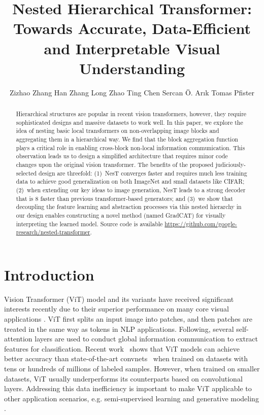 \documentclass{article}
\newcommand{\OURS}{NesT\xspace}
\begin{document}
\title{Nested Hierarchical Transformer: Towards Accurate, Data-Efficient and Interpretable Visual Understanding}
\author{
Zizhao Zhang 
\;
Han Zhang  
\; 
Long Zhao 
\;
Ting Chen 
\;
Sercan \"{O}. Ar{\i}k
\; 
Tomas Pfister
}

\maketitle


\begin{abstract}
Hierarchical structures are popular in recent vision transformers, however, they require sophisticated designs and massive datasets to work well. 
In this paper, we explore the idea of nesting basic local transformers on non-overlapping image blocks and aggregating them in a hierarchical way. 
We find that the block aggregation function plays a critical role in enabling cross-block non-local information communication.
This observation leads us to design a simplified architecture that requires minor code changes upon the original vision transformer.
The benefits of the proposed judiciously-selected design are threefold: 
(1)~\OURS converges faster and requires much less training data to achieve good generalization on both ImageNet and small datasets like CIFAR;
(2)~when extending our key ideas to image generation, \OURS leads to a strong decoder that is 8 faster than previous transformer-based generators; and
(3)~we show that decoupling the feature learning and abstraction processes via this nested hierarchy in our design enables constructing a novel method (named GradCAT) for visually interpreting the learned model.
Source code is available \url{https://github.com/google-research/nested-transformer}.
\end{abstract}

\section{Introduction}

Vision Transformer (ViT) \cite{dosovitskiy2020image} model and its variants have received significant interests recently due to their superior performance on many core visual applications \cite{cordonnier2019relationship,liu2021swin}. 
ViT first splits an input image into patches, and then patches are treated in the same way as tokens in NLP applications.
Following, several self-attention layers are used to conduct global information communication to extract features for classification. 
Recent work~\cite{dosovitskiy2020image,cordonnier2019relationship} shows that ViT models can achieve better accuracy than state-of-the-art convnets~\cite{tan2019efficientnet,he2016deep} when trained on datasets with tens or hundreds of millions of labeled samples. 
However, when trained on smaller datasets, ViT usually underperforms its counterparts based on convolutional layers.
Addressing this data inefficiency is important to make ViT applicable to other application scenarios, e.g. semi-supervised learning \cite{sohn2020fixmatch} and generative modeling \cite{goodfellow2014generative,zhang2019self}. 
\end{document}
